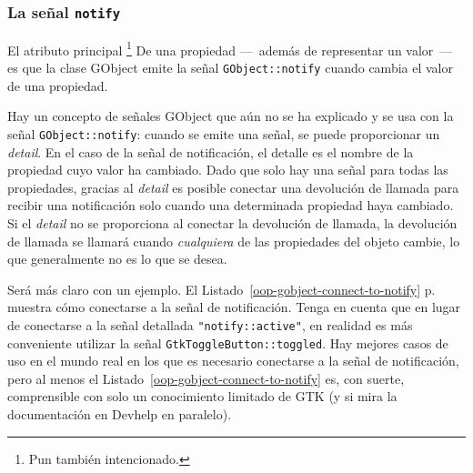 \subsubsection{La señal \lstinline{notify} }

El atributo principal \footnote{Pun también intencionado.} De una propiedad ---~además de representar un valor~--- es que la clase GObject emite la señal \lstinline{GObject::notify} cuando cambia el valor de una propiedad.

Hay un concepto de señales GObject que aún no se ha explicado y se usa con la señal \lstinline{GObject::notify}: cuando se emite una señal, se puede proporcionar un \emph{detail}. En el caso de la señal de notificación, el detalle es el nombre de la propiedad cuyo valor ha cambiado. Dado que solo hay una señal para todas las propiedades, gracias al \emph{detail} es posible conectar una devolución de llamada para recibir una notificación solo cuando una determinada propiedad haya cambiado. Si el \emph{detail} no se proporciona al conectar la devolución de llamada, la devolución de llamada se llamará cuando \emph{cualquiera} de las propiedades del objeto cambie, lo que generalmente no es lo que se desea.

Será más claro con un ejemplo. El Listado~\ref{oop-gobject-connect-to-notify} p.~\pageref{oop-gobject-connect-to-notify} muestra cómo conectarse a la señal de notificación. Tenga en cuenta que en lugar de conectarse a la señal detallada \lstinline{"notify::active"}, en realidad es más conveniente utilizar la señal \lstinline{GtkToggleButton::toggled}. Hay mejores casos de uso en el mundo real en los que es necesario conectarse a la señal de notificación, pero al menos el Listado~\ref{oop-gobject-connect-to-notify} es, con suerte, comprensible con solo un conocimiento limitado de GTK (y si mira la documentación en Devhelp en paralelo).


